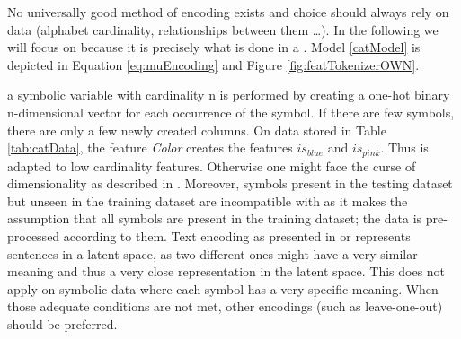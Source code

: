 

No universally good method of encoding exists and choice should always rely on data (alphabet cardinality, relationships between them \dots). In the following we will focus on \ohe because it is precisely what is done in a \catmod. Model \ref{catModel} \ohe is depicted in Equation \ref{eq:muEncoding} and Figure \ref{fig:featTokenizerOWN}.


\ohe a symbolic variable with cardinality n is performed by creating a one-hot binary n-dimensional vector for each occurrence of the symbol. If there are few symbols, there are only a few newly created columns. On data stored in Table \ref{tab:catData}, \ohe the feature \textit{Color} creates the features $is_{blue}$ and $is_{pink}$. Thus \ohe is adapted to low cardinality features. Otherwise one might face the curse of dimensionality as described in \cite{curse}. Moreover, symbols present in the testing dataset but unseen in the training dataset are incompatible with \ohe as it makes the assumption that all symbols are present in the training dataset; the data is pre-processed according to them. Text encoding as presented in \cite{sundae} or \cite{textClassification} represents sentences in a latent space, as two different ones might have a very similar meaning and thus a very close representation in the latent space. This does not apply on symbolic data where each symbol has a very specific meaning.
When those adequate conditions are not met, other encodings (such as leave-one-out) should be preferred. 


